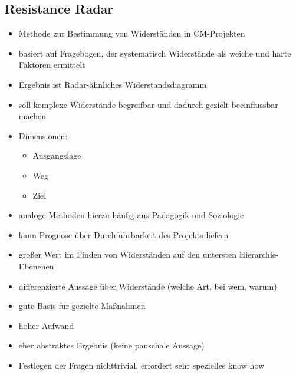 \documentclass[a4paper, 12pt]{article}
\begin{document}
\subsection{Resistance Radar}
\begin{itemize}
  \item Methode zur Bestimmung von Widerständen in CM-Projekten
  \item basiert auf Fragebogen, der systematisch Widerstände als weiche und harte Faktoren ermittelt
  \item Ergebnis ist Radar-ähnliches Widerstandsdiagramm
  \item soll komplexe Widerstände begreifbar und dadurch gezielt beeinflussbar machen
  \item Dimensionen:
    \begin{itemize}
      \item Ausgangslage
      \item Weg
      \item Ziel
    \end{itemize}
  \item analoge Methoden hierzu häufig aus Pädagogik und Soziologie
  \item kann Prognose über Durchführbarkeit des Projekts liefern
  \item großer Wert im Finden von Widerständen auf den untersten Hierarchie-Ebenenen
\end{itemize}
\begin{itemize}
  \renewcommand{\labelitemi}{+}%
  \item differenzierte Aussage über Widerstände (welche Art, bei wem, warum)
  \item gute Basis für gezielte Maßnahmen
\end{itemize}
\begin{itemize}
  \renewcommand{\labelitemi}{\(-\)}%
  \item hoher Aufwand
  \item eher abstraktes Ergebnis (keine pauschale Aussage)
  \item Festlegen der Fragen nichttrivial, erfordert sehr spezielles know how
\end{itemize}
\end{document}
